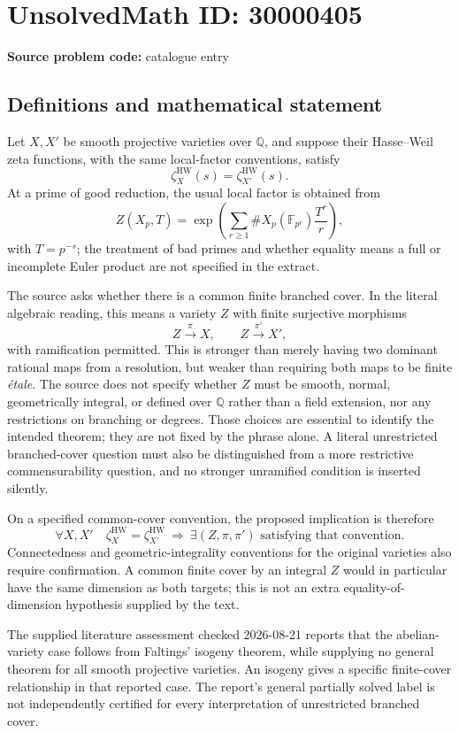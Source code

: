 \documentclass[11pt]{article}
\newcommand{\Q}{\mathbb{Q}}
\newcommand{\F}{\mathbb{F}}
\begin{document}
\section*{UnsolvedMath ID: 30000405}
\textbf{Source problem code:} catalogue entry
\subsection{Definitions and mathematical statement}
Let \(X,X'\) be smooth projective varieties over \(\Q\), and suppose their Hasse--Weil zeta functions, with the same local-factor conventions, satisfy
\[
\zeta_X^{\mathrm{HW}}(s)=\zeta_{X'}^{\mathrm{HW}}(s).
\]
At a prime of good reduction, the usual local factor is obtained from
\[
Z(X_p,T)=\exp\left(\sum_{r\geq1}\#X_p(\F_{p^r})\frac{T^r}{r}\right),
\]
with \(T=p^{-s}\); the treatment of bad primes and whether equality means a full or incomplete Euler product are not specified in the extract.

The source asks whether there is a common finite branched cover. In the literal algebraic reading, this means a variety \(Z\) with finite surjective morphisms
\[
Z\xrightarrow{\pi}X,\qquad Z\xrightarrow{\pi'}X',
\]
with ramification permitted. This is stronger than merely having two dominant rational maps from a resolution, but weaker than requiring both maps to be finite \emph{\'etale}. The source does not specify whether \(Z\) must be smooth, normal, geometrically integral, or defined over \(\Q\) rather than a field extension, nor any restrictions on branching or degrees. Those choices are essential to identify the intended theorem; they are not fixed by the phrase alone. A literal unrestricted branched-cover question must also be distinguished from a more restrictive commensurability question, and no stronger unramified condition is inserted silently.

On a specified common-cover convention, the proposed implication is therefore
\[
\forall X,X'\quad
\zeta_X^{\mathrm{HW}}=\zeta_{X'}^{\mathrm{HW}}
\ \Longrightarrow\ 
\exists(Z,\pi,\pi')\text{ satisfying that convention}.
\]
Connectedness and geometric-integrality conventions for the original varieties also require confirmation. A common finite cover by an integral \(Z\) would in particular have the same dimension as both targets; this is not an extra equality-of-dimension hypothesis supplied by the text.

The supplied literature assessment checked 2026-08-21 reports that the abelian-variety case follows from Faltings' isogeny theorem, while supplying no general theorem for all smooth projective varieties. An isogeny gives a specific finite-cover relationship in that reported case. The report's general partially solved label is not independently certified for every interpretation of unrestricted branched cover.
\end{document}
